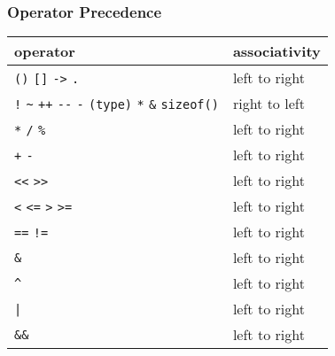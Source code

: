 \documentclass[10pt, t]{beamer}
\begin{document}
\begin{frame}
\frametitle{Operator Precedence}
\label{sec-3_1_9}

\newcommand{\pipe}{|}

\begin{center}
\begin{tabular}{ll}
\hline
 operator                                                                                                                                    &  associativity  \\
\hline
 \texttt{()} \texttt{[]} \texttt{->} \texttt{.}                                                                                              &  left to right  \\
 \texttt{!} \texttt{\textasciitilde{}} \texttt{++} \texttt{-}\texttt{-} \texttt{-} \texttt{(type)} \texttt{*} \texttt{\&} \texttt{sizeof()}  &  right to left  \\
 \texttt{*} \texttt{/} \texttt{\%}                                                                                                           &  left to right  \\
 \texttt{+} \texttt{-}                                                                                                                       &  left to right  \\
 \texttt{<}\texttt{<} \texttt{>}\texttt{>}                                                                                                   &  left to right  \\
 \texttt{<} \texttt{<=} \texttt{>} \texttt{>=}                                                                                               &  left to right  \\
 \texttt{==} \texttt{!=}                                                                                                                     &  left to right  \\
 \texttt{\&}                                                                                                                                 &  left to right  \\
 \texttt{\textasciicircum{}}                                                                                                                 &  left to right  \\
 \texttt{\pipe}                                                                                                                              &  left to right  \\
 \texttt{\&\&}                                                                                                                               &  left to right  \\

\end{tabular}
\end{center}
\end{frame}
\end{document}
